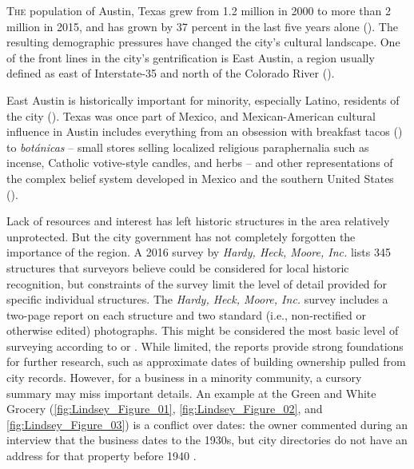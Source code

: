 \IJSRAopening%
\lettrine{T}{he} population of Austin, Texas grew from \num{1.2} million in 2000 to more than \num{2} million in 2015, and has grown by \num{37} percent in the last five years alone (\cite{kerr}). The resulting demographic pressures have changed the city's cultural landscape. One of the front lines in the city's gentrification is East Austin, a region usually defined as east of Interstate-35 and north of the Colorado River (\cite{hernandez}).

East Austin is historically important for minority, especially Latino, residents of the city (\cite{hernandez}). Texas was once part of Mexico, and Mexican-American cultural influence in Austin includes everything from an obsession with breakfast tacos (\cite{hernandez}) to \emph{botánicas} 
-- small stores selling localized religious paraphernalia such as incense, Catholic votive-style candles, and herbs --
and other representations of the complex belief system developed in Mexico and the southern United States (\cite{kreneck}).

Lack of resources and interest has left historic structures in the area relatively unprotected. But the city government has not completely forgotten the importance of the region. A 2016 survey by \emph{Hardy, Heck, Moore, Inc.} lists \num{345} structures that surveyors believe could be considered for local historic recognition, but constraints of the survey limit the level of detail provided for specific individual structures. The \emph{Hardy, Heck, Moore, Inc.} survey includes a two-page report on each structure and two standard (i.e., non-rectified or otherwise edited) photographs. This might be considered the most basic level of surveying according to \textcite[25]{lane} or \textcite[370]{pluciennik}. 
While limited, the reports provide strong foundations for further research, such as approximate dates of building ownership pulled from city records. However, for a business in a minority community, a cursory summary may miss important details. 
An example at the Green and White Grocery (\cref{fig:Lindsey_Figure_01}, \cref{fig:Lindsey_Figure_02}, and \cref{fig:Lindsey_Figure_03}) is a conflict over dates: the owner commented during an interview that the business dates to the 1930s, but city directories do not have an address for that property before 1940 
\parencite[75-76]{hardy}.

